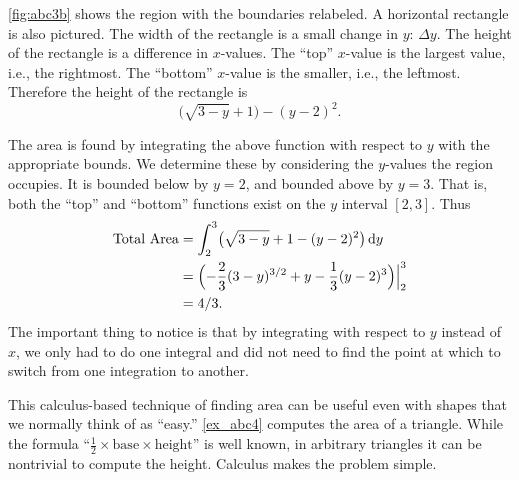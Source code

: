 \begin{example}
\autoref{fig:abc3b} shows the region with the boundaries relabeled. A
horizontal rectangle is also pictured. The width of the rectangle is a small change in $y$: $\Delta y$. The height of the rectangle is a difference in $x$-values. The ``top'' $x$-value is the largest value, i.e., the rightmost. The ``bottom'' $x$-value is the smaller, i.e., the leftmost. Therefore the height of the rectangle is
\[\bigl(\sqrt{3-y}+1\bigr) - (y-2)^2.\]

The area is found by integrating the above function with respect to $y$ with the appropriate bounds. We determine these by considering the $y$-values the region occupies. It is bounded below by $y=2$, and bounded above by $y=3$. That is, both the ``top'' and ``bottom'' functions exist on the $y$ interval $[2,3]$. Thus
\begin{align*}
	\text{Total Area}
	&= \int_2^3 \bigl(\sqrt{3-y}+1 - (y-2)^2\bigr)\operatorname{d}\! y \\
	&= \Bigl(-\frac23(3-y)^{3/2}+y-\frac13(y-2)^3\Bigr)\Big|_2^3 \\
	&= 4/3.
\end{align*}
The important thing to notice is that by integrating with respect to $y$ instead of $x$, we only had to do one integral and did not need to find the point at which to switch from one integration to another.
\end{example}

This calculus-based technique of finding area can be useful even with shapes that we normally think of as ``easy.'' \autoref{ex_abc4} computes the area of a triangle. While the formula ``$\frac12\times\text{base}\times\text{height}$'' is well known, in arbitrary triangles it can be nontrivial to compute the height. Calculus makes the problem simple.

